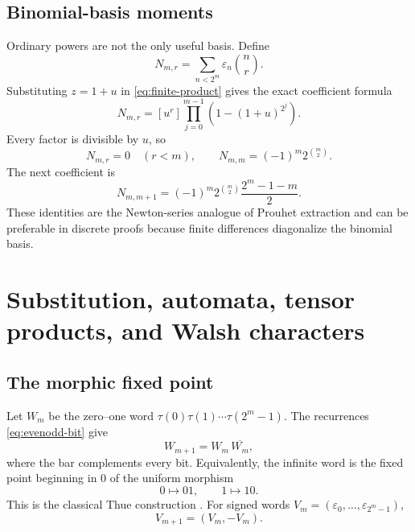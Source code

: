 \documentclass[11pt,oneside]{article}
\theoremstyle{definition}
\theoremstyle{remark}
\begin{document}
\subsection{Binomial-basis moments}

Ordinary powers are not the only useful basis.  Define
\begin{equation}
 N_{m,r}=\sum_{n<2^m}\varepsilon_n\binom nr.
 \label{eq:newton-moment-def}
\end{equation}
Substituting \(z=1+u\) in \eqref{eq:finite-product} gives the exact coefficient
formula
\begin{equation}
 \boxed{\quad
 N_{m,r}=[u^r]\prod_{j=0}^{m-1}\left(1-(1+u)^{2^j}\right).
 \quad}
 \label{eq:newton-moment-product}
\end{equation}
Every factor is divisible by \(u\), so
\begin{equation}
 N_{m,r}=0\quad(r<m),
 \qquad
 N_{m,m}=(-1)^m2^{\binom m2}.
 \label{eq:newton-leading}
\end{equation}
The next coefficient is
\begin{equation}
 N_{m,m+1}
 =(-1)^m2^{\binom m2}\frac{2^m-1-m}{2}.
 \label{eq:newton-next}
\end{equation}
These identities are the Newton-series analogue of Prouhet extraction and can
be preferable in discrete proofs because finite differences diagonalize the
binomial basis.

\section{Substitution, automata, tensor products, and Walsh characters}
\label{sec:automatic}

\subsection{The morphic fixed point}

Let \(W_m\) be the zero--one word
\(\tau(0)\tau(1)\cdots\tau(2^m-1)\).  The recurrences
\eqref{eq:evenodd-bit} give
\begin{equation}
 W_{m+1}=W_m\,\overline{W_m},
 \label{eq:word-complement}
\end{equation}
where the bar complements every bit.  Equivalently, the infinite word is the
fixed point beginning in \(0\) of the uniform morphism
\begin{equation}
 0\longmapsto01,
 \qquad
 1\longmapsto10.
 \label{eq:morphism}
\end{equation}
This is the classical Thue construction \cite{thue1906,alloucheShallit1999}.
For signed words \(V_m=(\varepsilon_0,\ldots,\varepsilon_{2^m-1})\),
\begin{equation}
 V_{m+1}=(V_m,-V_m).
 \label{eq:signed-word-recursion}
\end{equation}
\end{document}
